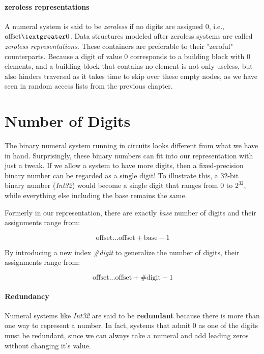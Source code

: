 \documentclass[\main/thesis.tex]{subfiles}
\begin{document}
\paragraph{zeroless representations}
A numeral system is said to be \textit{zeroless} if no digits are assigned $ 0 $,
i.e., $ \text{offset} \textgreater 0 $.
Data structures modeled after zeroless systems are called \textit{zeroless representations}.
These containers are preferable to their "zeroful" counterparts.
Because a digit of value $ 0 $ corresponds to a building block with $ 0 $ elements,
and a building block that contains no element is not only useless,
but also hinders traversal as it takes time to skip over these empty nodes,
as we have seen in random access lists from the previous chapter.

\section{Number of Digits}

The binary numeral system running in circuits looks different from what we have
in hand.
Surprisingly, these binary numbers can fit into our representation with just a tweak.
If we allow a system to have more digits,
then a fixed-precision binary number can be regarded as a single digit!
To illustrate this,
a 32-bit binary number (\textit{Int32}) would become a single digit that ranges
from $ 0 $ to $ 2^{32} $, while everything else including the base remains the same.

Formerly in our representation,
there are exactly \textit{base} number of digits and their assignments range from:

$$
    \text{offset}  ...  \text{offset} + \text{base} - 1
$$

By introducing a new index \textit{\#digit} to generalize the number of digits,
their assignments range from:

$$
    \text{offset}  ...  \text{offset} + \text{\#digit} - 1
$$

\paragraph{Redundancy}

Numeral systems like \textit{Int32} are said to be \textbf{redundant}
because there is more than one way to represent a number.
In fact, systems that admit $ 0 $ as one of the digits must be redundant,
since we can always take a numeral and add leading zeros without changing it's value.
\end{document}
